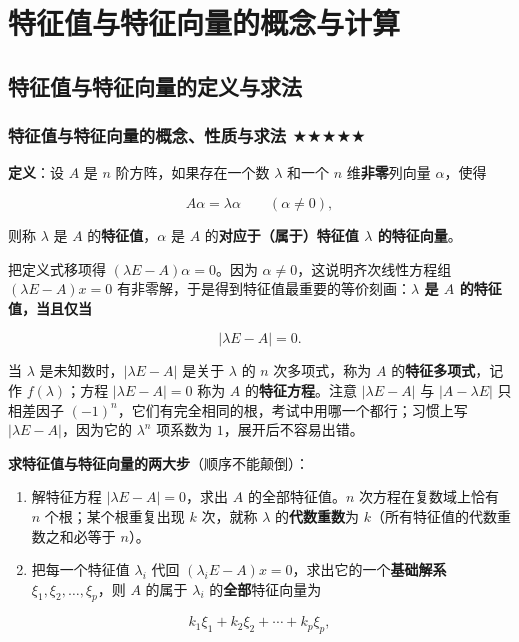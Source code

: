 \documentclass[11pt,openany,UTF8]{ctexbook}
\begin{document}
\section{特征值与特征向量的概念与计算}

\subsection{特征值与特征向量的定义与求法}

\subsubsection{特征值与特征向量的概念、性质与求法 $\bigstar$$\bigstar$$\bigstar$$\bigstar$$\bigstar$}

\textbf{定义}：设 $A$ 是 $n$ 阶方阵，如果存在一个数 $\lambda$ 和一个 $n$ 维\textbf{非零}列向量 $\alpha$，使得

\[A\alpha=\lambda\alpha\qquad(\alpha\neq 0),\]

则称 $\lambda$ 是 $A$ 的\textbf{特征值}，$\alpha$ 是 $A$ 的\textbf{对应于（属于）特征值 $\lambda$ 的特征向量}。

把定义式移项得 $(\lambda E-A)\alpha=0$。因为 $\alpha\neq 0$，这说明齐次线性方程组 $(\lambda E-A)x=0$ 有非零解，于是得到特征值最重要的等价刻画：\textbf{$\lambda$ 是 $A$ 的特征值，当且仅当}

\[\vert\lambda E-A\vert=0 .\]

当 $\lambda$ 是未知数时，$\vert\lambda E-A\vert$ 是关于 $\lambda$ 的 $n$ 次多项式，称为 $A$ 的\textbf{特征多项式}，记作 $f(\lambda)$；方程 $\vert\lambda E-A\vert=0$ 称为 $A$ 的\textbf{特征方程}。注意 $\vert\lambda E-A\vert$ 与 $\vert A-\lambda E\vert$ 只相差因子 $(-1)^n$，它们有完全相同的根，考试中用哪一个都行；习惯上写 $\vert\lambda E-A\vert$，因为它的 $\lambda^n$ 项系数为 $1$，展开后不容易出错。

\textbf{求特征值与特征向量的两大步}（顺序不能颠倒）：

\begin{enumerate}
\item 解特征方程 $\vert\lambda E-A\vert=0$，求出 $A$ 的全部特征值。$n$ 次方程在复数域上恰有 $n$ 个根；某个根重复出现 $k$ 次，就称 $\lambda$ 的\textbf{代数重数}为 $k$（所有特征值的代数重数之和必等于 $n$）。
\item 把每一个特征值 $\lambda_i$ 代回 $(\lambda_i E-A)x=0$，求出它的一个\textbf{基础解系} $\xi_1,\xi_2,\dots,\xi_p$，则 $A$ 的属于 $\lambda_i$ 的\textbf{全部}特征向量为
\end{enumerate}
\[k_1\xi_1+k_2\xi_2+\cdots+k_p\xi_p,\]
\end{document}
